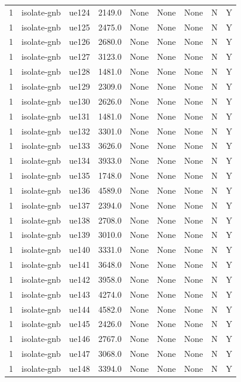 \begin{table}[ht]
\begin{tabular}{|c|c|c|c|c|c|c|c|c|}
1 & isolate-gnb & ue124 & 2149.0 & None & None & None & N & Y \\
1 & isolate-gnb & ue125 & 2475.0 & None & None & None & N & Y \\
1 & isolate-gnb & ue126 & 2680.0 & None & None & None & N & Y \\
1 & isolate-gnb & ue127 & 3123.0 & None & None & None & N & Y \\
1 & isolate-gnb & ue128 & 1481.0 & None & None & None & N & Y \\
1 & isolate-gnb & ue129 & 2309.0 & None & None & None & N & Y \\
1 & isolate-gnb & ue130 & 2626.0 & None & None & None & N & Y \\
1 & isolate-gnb & ue131 & 1481.0 & None & None & None & N & Y \\
1 & isolate-gnb & ue132 & 3301.0 & None & None & None & N & Y \\
1 & isolate-gnb & ue133 & 3626.0 & None & None & None & N & Y \\
1 & isolate-gnb & ue134 & 3933.0 & None & None & None & N & Y \\
1 & isolate-gnb & ue135 & 1748.0 & None & None & None & N & Y \\
1 & isolate-gnb & ue136 & 4589.0 & None & None & None & N & Y \\
1 & isolate-gnb & ue137 & 2394.0 & None & None & None & N & Y \\
1 & isolate-gnb & ue138 & 2708.0 & None & None & None & N & Y \\
1 & isolate-gnb & ue139 & 3010.0 & None & None & None & N & Y \\
1 & isolate-gnb & ue140 & 3331.0 & None & None & None & N & Y \\
1 & isolate-gnb & ue141 & 3648.0 & None & None & None & N & Y \\
1 & isolate-gnb & ue142 & 3958.0 & None & None & None & N & Y \\
1 & isolate-gnb & ue143 & 4274.0 & None & None & None & N & Y \\
1 & isolate-gnb & ue144 & 4582.0 & None & None & None & N & Y \\
1 & isolate-gnb & ue145 & 2426.0 & None & None & None & N & Y \\
1 & isolate-gnb & ue146 & 2767.0 & None & None & None & N & Y \\
1 & isolate-gnb & ue147 & 3068.0 & None & None & None & N & Y \\
1 & isolate-gnb & ue148 & 3394.0 & None & None & None & N & Y \\

\end{tabular}
\end{table}
